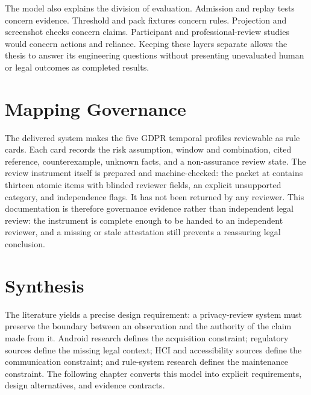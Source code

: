 The model also explains the division of evaluation. Admission and replay tests concern evidence. Threshold and pack fixtures concern rules. Projection and screenshot checks concern claims. Participant and professional-review studies would concern actions and reliance. Keeping these layers separate allows the thesis to answer its engineering questions without presenting unevaluated human or legal outcomes as completed results.


\section{Mapping Governance}

The delivered system makes the five GDPR temporal profiles reviewable as rule cards. Each card records the risk assumption, window and combination, cited reference, counterexample, unknown facts, and a non-assurance review state. The review instrument itself is prepared and machine-checked: the packet at  contains thirteen atomic items with blinded reviewer fields, an explicit unsupported category, and independence flags. It has not been returned by any reviewer. This documentation is therefore governance evidence rather than independent legal review: the instrument is complete enough to be handed to an independent reviewer, and a missing or stale attestation still prevents a reassuring legal conclusion.

\section{Synthesis}

The literature yields a precise design requirement: a privacy-review system must preserve the boundary between an observation and the authority of the claim made from it. Android research defines the acquisition constraint; regulatory sources define the missing legal context; HCI and accessibility sources define the communication constraint; and rule-system research defines the maintenance constraint. The following chapter converts this model into explicit requirements, design alternatives, and evidence contracts.
